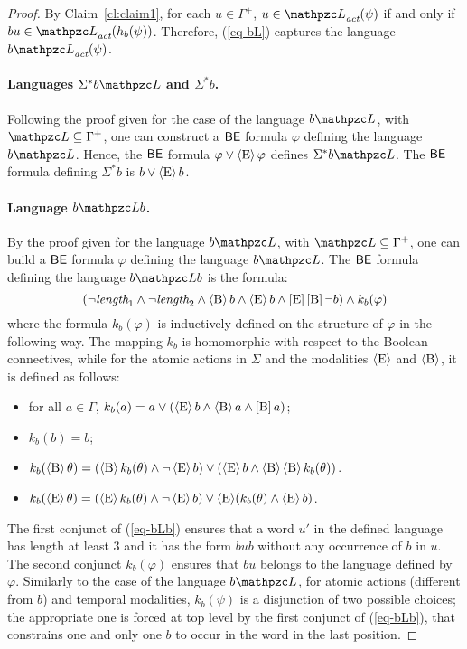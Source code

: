 \begin{proof}
 By Claim~\ref{cl:claim1}, for each $u\in \Gamma^{+}$, $u\in \Lang_\act(\psi)$ if and only if $bu\in \Lang_\act(h_b(\psi))$. Therefore, (\ref{eq-bL}) captures the language $b\Lang_\act(\psi)$. 

\paragraph{Languages $\Sigma^* b\Lang$ and $\Sigma^* b$.} Following the proof given for the case of the language $b\Lang$, with $\Lang\subseteq \Gamma^{+}$, one can construct a
 $\mathsf{BE}$ formula  $\varphi$ defining the language $b\Lang$. Hence, the $\mathsf{BE}$ formula $\varphi\vee \operatorname{\langle E\rangle}\varphi$ defines $\Sigma^* b\Lang$. The $\mathsf{BE}$ formula defining $\Sigma^* b$ is $b \vee \operatorname{\langle E\rangle} b$. 

\paragraph{Language $b\Lang b$.} By the proof given for the language $b\Lang$, with $\Lang\subseteq \Gamma^{+}$, one can build a $\mathsf{BE}$ formula  $\varphi$ defining the language $b\Lang$. The $\mathsf{BE}$ formula defining the language $b\Lang b$ is the formula:
%
\begin{equation}
\label{eq-bLb}
(\neg \textit{length}_1 \wedge \neg \textit{length}_2 \wedge \operatorname{\langle B\rangle} b \wedge \operatorname{\langle E\rangle} b \wedge \operatorname{\mathopen[ E \mathclose]}\operatorname{\mathopen[ B \mathclose]}\neg b) \wedge k_b(\varphi)
\end{equation}
%
where the formula  $k_b(\varphi)$ is inductively defined on the structure of $\varphi$  in the following way. 
The mapping $k_b$ is homomorphic with respect to the Boolean connectives, while for the atomic actions in $\Sigma$ and the modalities $\operatorname{\langle E\rangle}$ and $\operatorname{\langle B\rangle}$, it is defined  as follows:
 \begin{itemize}
   \item for all $a\in \Gamma$, $k_b(a)= a\vee (\operatorname{\langle E\rangle} b \wedge \operatorname{\langle B\rangle} a \wedge \operatorname{\mathopen[ B \mathclose]} a)$;
   \item $k_b(b)=b$;
   \item $k_b(\operatorname{\langle B\rangle}\theta)= (\operatorname{\langle B\rangle} k_b(\theta) \wedge \neg\operatorname{\langle E\rangle} b) \vee (\operatorname{\langle E\rangle} b \wedge \operatorname{\langle B\rangle} \operatorname{\langle B\rangle} k_b(\theta))$.
      \item $k_b(\operatorname{\langle E\rangle}\theta)= (\operatorname{\langle E\rangle} k_b(\theta)\wedge \neg\operatorname{\langle E\rangle} b) \vee \operatorname{\langle E\rangle}(k_b(\theta)\wedge \operatorname{\langle E\rangle} b)$.
 \end{itemize}

The first conjunct of (\ref{eq-bLb}) ensures that a word $u'$ in the defined language has length at least $3$ and it has the form $bub$ without any occurrence of $b$ in $u$. The second conjunct $k_b(\varphi)$ ensures that $bu$ belongs to the language defined by $\varphi$. Similarly to the case of the language $b\Lang$, for atomic actions (different from $b$) and temporal modalities, $k_b(\psi)$ is a disjunction of two possible choices; the appropriate one is forced at top level by the first conjunct of  (\ref{eq-bLb}), that constrains one and only one $b$ to occur in the word in the last position.


\end{proof}

